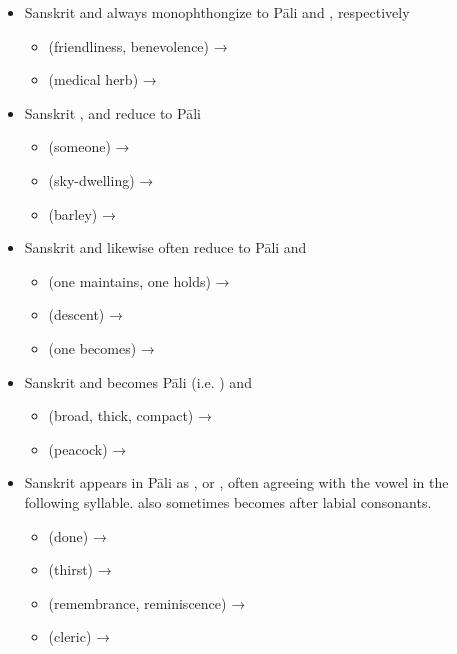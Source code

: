 \begin{itemize}
	\item Sanskrit  and  always monophthongize to Pāli  and , respectively
		\begin{itemize}
			\item {} (friendliness, benevolence) → 
			\item {} (medical herb) → 
		\end{itemize}
	\item Sanskrit ,  and  reduce to Pāli 
		\begin{itemize}
			\item {} (someone) → 
			\item {} (sky-dwelling) → 
			\item {} (barley) → 
		\end{itemize}
	\item Sanskrit  and  likewise often reduce to Pāli  and 
		\begin{itemize}
			\item {} (one maintains, one holds) → 
			\item {} (descent) → 
			\item {} (one becomes) → 
		\end{itemize}
	\item Sanskrit  and  becomes Pāli  (i.e. ) and 
		\begin{itemize}
			\item {} (broad, thick, compact) → 
			\item {} (peacock) → 
		\end{itemize}
	\item Sanskrit  appears in Pāli as ,  or , often agreeing with the vowel in the following syllable.  also sometimes becomes  after labial consonants.
		\begin{itemize}
			\item {} (done) → 
			\item {} (thirst) → 
			\item {} (remembrance, reminiscence) → 
			\item {} (cleric) → 

\end{itemize}
\end{itemize}
